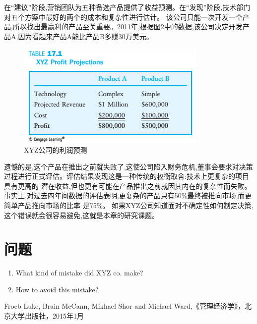 \documentclass[10pt, a4paper]{ctexart} %
\begin{document}
在“建议”阶段,营销团队为五种备选产品提供了收益预测。在“发现”阶段,技术部门对五个方案中最好的两个的成本和复杂性进行估计。
该公司只能一次开发一个产品,所以找出最赢利的产品至关重要。2011年,根据图2中的数据,该公司决定开发产品A,因为看起来产品A能比产品B多赚30万美元。
\begin{figure}[ht]
	\centering
	\includegraphics[scale=1]{fig//xyz2} %
	\caption{XYZ公司的利润预测} %
	\label{xyz2} %
\end{figure}

遗憾的是,这个产品在推出之前就失败了,这使公司陷入财务危机,董事会要求对决策过程进行正式评估。评估结果发现这是一种传统的权衡取舍:技术上更复杂的项目具有更高的
潜在收益,但也更有可能在产品推出之前就因其内在的复杂性而失败。事实上,对过去四年间数据的评估表明,更复杂的产品只有50\%最终被推向市场,而更简单产品推向市场的比率
是75\%。
如果XYZ公司知道面对不确定性如何制定决策,这个错误就会很容易避免,这就是本章的研究课题。


\section*{问题}
\begin{enumerate}
	\item What kind of mistake did XYZ co. make?
	\item How to avoid this mistake?
	
\end{enumerate}




\small
\begin{thebibliography}{99}
	\setlength{\parskip}{0pt} %
	 Froeb Luke, Brain McCann, Mikhael Shor and Michael Ward,《管理经济学》，北京大学出版社，2015年1月
	\end {thebibliography}
\end{document}
